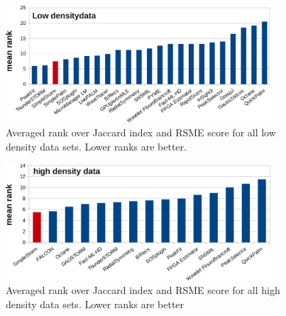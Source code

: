 \begin{figure}
\centering
\includegraphics[width = 0.88\textwidth]{pictures/diagrammsChallenge/MeanRankLowDensityCropped.pdf}
	\caption{Averaged rank over Jaccard index and RSME score for all low density data sets. Lower ranks are better.}
	\label{meanRankLow}
\end{figure}

\begin{figure}
\centering
\includegraphics[width = 0.88\textwidth]{pictures/diagrammsChallenge/MeanRankHighDensityCropped.pdf}
	\caption{Averaged rank over Jaccard index and RSME score for all high density data sets. Lower ranks are better}
	\label{meanRankHigh}
\end{figure}

\listoffigures
\listoftables